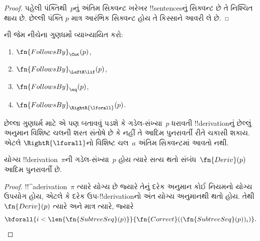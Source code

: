 \documentclass[../../../include/open-logic-section]{subfiles}
\begin{document}
\begin{proof}
પહેલી પંક્તિથી~$p$નું અંતિમ સિક્વન્ટ
ખરેખર !!{sentence}sનું સિક્વન્ટ છે
તે નિશ્ચિત થાય છે. છેલ્લી પંક્તિ
$p$ માત્ર આરંભિક સિક્વન્ટ હોય તે
કિસ્સાને આવરી લે છે.
\end{proof}

\begin{prob}
  ની
  જેમ નીચેના ગુણધર્મો વ્યાખ્યાયિત કરો:
  \begin{enumerate}
  \item $\fn{FollowsBy}_{\Cut}(p)$,
  \item $\fn{FollowsBy}_{\LeftR\lif}(p)$,
  \item $\fn{FollowsBy}_{\eq}(p)$,
  \item $\fn{FollowsBy}_{\RightR{\lforall}}(p)$.
  \end{enumerate}
  છેલ્લા ગુણધર્મ માટે એ પણ બતાવવું પડશે
  કે ગડેલ-સંખ્યા~$p$ ધરાવતી
  !!{derivation}નું છેલ્લું અનુમાન
  વિશિષ્ટ ચલની શરત સંતોષે છે કે નહીં
  તે આદિમ પુનરાવર્તી રીતે ચકાસી શકાય.
  એટલે $\RightR{\lforall}$નો વિશિષ્ટ
  ચલ~$a$ અંતિમ સિક્વન્ટમાં આવતો નથી.
  \end{prob}
  

\begin{prop}
  યોગ્ય !!{derivation}~$\pi$ની
  ગડેલ-સંખ્યા~$p$ હોય ત્યારે સત્ય
  થતો સંબંધ~$\fn{Deriv}(p)$ આદિમ
  પુનરાવર્તી છે.
\end{prop}

\begin{proof}
  !!^a{derivation}~$\pi$ ત્યારે યોગ્ય
  છે જ્યારે તેનું દરેક અનુમાન કોઈ
  નિયમનો યોગ્ય ઉપયોગ હોય, એટલે કે
  દરેક ઉપ-!!{derivation}નો અંત યોગ્ય
  અનુમાનથી થતો હોય. તેથી
  $\fn{Deriv}(p)$ ત્યારે અને માત્ર ત્યારે,
  જ્યારે
  \[
  \bforall{i<\len{\fn{SubtreeSeq}(p)}}{\fn{Correct}((\fn{SubtreeSeq}(p))_i)}.
  \]
\end{proof}
\end{document}
